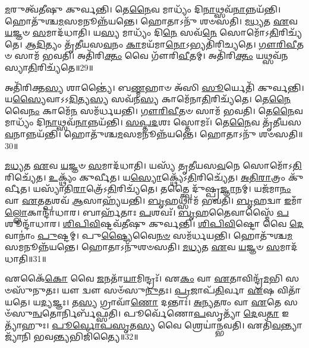 \-\ul{𑌮}\-𑌰𑍁𑌤𑍍𑌵᳴𑌤𑍀𑌷𑍁 𑌕𑍁𑌰𑍍𑌵𑌨𑍍𑌤𑌿।
𑌤𑍇\-\ul{𑌨𑍈}\-𑌵 𑌮𑌾𑌧𑍍𑌯𑌂᳴ 𑌦𑌿\-\ul{𑌨𑌾}\-𑌥𑍍𑌸𑌵᳴\-\ul{𑌨𑌾}\-𑌨𑍍𑌨𑌯᳴𑌨𑍍𑌤𑌿।
𑌹𑍋𑌤𑍁᳴𑌶𑍍𑌚\-\ul{𑌮}\-𑌸𑌮𑌨𑍂𑌨𑍍𑌨᳴𑌯𑌨𑍍𑌤𑍇।
𑌹𑍋𑌤𑌾𑌽𑌨𑍁᳴ 𑌶𑍞𑌸𑌤𑌿।
\-\ul{𑌮}\-\-\ul{𑌧𑍍𑌯}\-𑌤 \ul{𑌏}\-𑌵 \ul{𑌯}\-𑌜𑍍𑌞𑍞 \ul{𑌸}\-𑌮𑌾𑌦᳴𑌧𑌾𑌤𑌿।
𑌯\-\ul{𑌸𑍍𑌯} 𑌮𑌾𑌧𑍍𑌯𑌂᳴ 𑌦𑌿\-\ul{𑌨𑍇} 𑌸𑌵᳴\-\ul{𑌨𑍇} 𑌸𑍋𑌮𑍋᳴\-𑌽\-\ul{𑌤𑌿}\-𑌰𑌿𑌚𑍍𑌯᳴𑌤𑍇।
\-\ul{𑌆}\-\-\ul{𑌦𑌿}\-𑌤𑍍𑌯𑌂 𑌤𑍃᳴𑌤𑍀𑌯𑌸\-\ul{𑌵}\-𑌨𑌂 \ul{𑌕𑌾}\-𑌮𑌯᳴𑌮𑌾\-\ul{𑌨𑍋}\-\-𑌽𑌭𑍍𑌯𑌤𑌿᳴𑌰𑌿𑌚𑍍𑌯𑌤𑍇।
\-\ul{𑌗𑍗}\-\-\ul{𑌰𑌿}\-\-\ul{𑌵𑍀}\-𑌤𑍞 𑌸𑌾𑌮᳴ 𑌭𑌵𑌤𑌿।
𑌅𑌤𑌿᳴𑌰𑌿\-\ul{𑌕𑍍𑌤𑌂} 𑌵𑍈 𑌗𑍗᳴𑌰𑌿\-\ul{𑌵𑍀}\-𑌤𑌮𑍍।
𑌅𑌤𑌿᳴𑌰𑌿\-\ul{𑌕𑍍𑌤𑌂} 𑌯𑌥𑍍𑌸𑌵᳴𑌨𑌸𑍍𑌯𑌾\-\ul{𑌤𑌿}\-𑌰𑌿𑌚𑍍𑌯᳴𑌤𑍇॥29॥

𑌅𑌤𑌿᳴𑌰𑌿𑌕𑍍𑌤\-\ul{𑌸𑍍𑌯} 𑌶𑌾𑌨𑍍𑌤𑍍𑌯𑍈॑।
𑌬\-\ul{𑌣𑍍𑌮}\-𑌹𑌾𑍞 𑌅᳴𑌸𑌿 \ul{𑌸𑍂}\-𑌰𑍍𑌯𑍇𑌤𑌿᳴ 𑌕𑍁𑌰𑍍𑌵𑌨𑍍𑌤𑌿।
𑌯\-\ul{𑌸𑍍𑌯𑍈}\-𑌵𑌾\-𑌽𑌽\-\ul{𑌦𑌿}\-𑌤𑍍𑌯\-\ul{𑌸𑍍𑌯} 𑌸𑌵᳴𑌨\-\ul{𑌸𑍍𑌯} 𑌕𑌾𑌮𑍇᳴𑌨𑌾\-\ul{𑌤𑌿}\-𑌰𑌿𑌚𑍍𑌯᳴𑌤𑍇।
𑌤𑍇\-\ul{𑌨𑍈}\-𑌵𑍈\-\ul{𑌨𑌂} 𑌕𑌾𑌮𑍇᳴\-\ul{𑌨} 𑌸𑌮᳴𑌰𑍍𑌧𑌯𑌨𑍍𑌤𑌿।
\-\ul{𑌗𑍗}\-\-\ul{𑌰𑌿}\-\-\ul{𑌵𑍀}\-𑌤𑍞 𑌸𑌾𑌮᳴ 𑌭𑌵𑌤𑌿।
𑌤𑍇\-\ul{𑌨𑍈}\-𑌵 𑌮𑌾𑌧𑍍𑌯𑌂᳴ 𑌦𑌿\-\ul{𑌨𑌾}\-𑌥𑍍𑌸𑌵᳴\-\ul{𑌨𑌾}\-𑌨𑍍𑌨𑌯᳴𑌨𑍍𑌤𑌿।
\-\ul{𑌸}\-\-\ul{𑌪𑍍𑌤}\-\-\ul{𑌦}\-𑌶𑌃 𑌸𑍍𑌤𑍋𑌮𑌃᳴।
𑌤𑍇\-\ul{𑌨𑍈}\-𑌵 𑌤𑍃᳴𑌤𑍀𑌯𑌸\-\ul{𑌵}\-𑌨𑌾𑌨𑍍𑌨𑌯᳴𑌨𑍍𑌤𑌿।
𑌹𑍋𑌤𑍁᳴𑌶𑍍𑌚\-\ul{𑌮}\-𑌸𑌮𑌨𑍂𑌨𑍍𑌨᳴𑌯𑌨𑍍𑌤𑍇।
𑌹𑍋𑌤𑌾𑌽𑌨𑍁᳴ 𑌶𑍞𑌸𑌤𑌿॥30॥

\-\ul{𑌮}\-\-\ul{𑌧𑍍𑌯}\-𑌤 \ul{𑌏}\-𑌵 \ul{𑌯}\-𑌜𑍍𑌞𑍞 \ul{𑌸}\-𑌮𑌾𑌦᳴𑌧𑌾𑌤𑌿।
𑌯𑌸𑍍𑌯᳴ 𑌤𑍃𑌤𑍀𑌯𑌸\-\ul{𑌵}\-𑌨𑍇 𑌸𑍋𑌮𑍋᳴\-𑌽\-\ul{𑌤𑌿}\-𑌰𑌿𑌚𑍍𑌯𑍇᳴𑌤।
\-\ul{𑌉}\-𑌕𑍍𑌥𑍍𑌯𑌂᳴ 𑌕𑍁𑌰𑍍𑌵𑍀𑌤।
𑌯\-\ul{𑌸𑍍𑌯𑍋}\-𑌕𑍍𑌥𑍍𑌯𑍇᳴\-𑌽\-\ul{𑌤𑌿}\-𑌰𑌿𑌚𑍍𑌯𑍇᳴𑌤।
\-\ul{𑌅}\-\-\ul{𑌤𑌿}\-\-\ul{𑌰𑌾}\-𑌤𑍍𑌰𑌂 𑌕𑍁᳴𑌰𑍍𑌵𑍀𑌤।
𑌯𑌸𑍍𑌯𑌾᳴𑌤𑌿\-\ul{𑌰𑌾}\-𑌤𑍍𑌰𑍇᳴\-𑌽\-\ul{𑌤𑌿}\-𑌰𑌿𑌚𑍍𑌯᳴𑌤𑍇।
𑌤𑌤𑍍𑌤𑍍𑌵𑍈 𑌦𑍁᳴𑌷𑍍𑌪𑍍𑌰\-\ul{𑌜𑍍𑌞𑌾}\-𑌨𑌮𑍍।
𑌯𑌜᳴𑌮𑌾\-\ul{𑌨𑌂} 𑌵𑌾 \ul{𑌏}\-𑌤\-\ul{𑌤𑍍𑌪}\-𑌶𑌵᳴ \ul{𑌆}\-𑌸𑌾𑌹𑍍𑌯᳴𑌯𑌨𑍍𑌤𑌿।
\-\ul{𑌬𑍃}\-𑌹𑌥𑍍𑌸𑌾𑌮᳴ 𑌭𑌵𑌤𑌿।
\-\ul{𑌬𑍃}\-𑌹𑌦𑍍𑌵𑌾 \ul{𑌇}\-𑌮𑌾𑌁\-\ul{𑌲𑍍𑌲𑍋}\-𑌕𑌾𑌨𑍍𑌦𑌾᳴𑌧𑌾𑌰।
𑌬𑌾𑌰𑍍\mbox{}𑌹᳴𑌤𑌾𑌃 \ul{𑌪}\-𑌶𑌵𑌃᳴।
\-\ul{𑌬𑍃}\-\-\ul{𑌹}\-𑌤𑍈𑌵𑌾𑌸𑍍𑌮𑍈᳴ \ul{𑌪}\-𑌶𑍂𑌨𑍍𑌦𑌾᳴𑌧𑌾𑌰।
\-\ul{𑌶𑌿}\-\-\ul{𑌪𑌿}\-\-\ul{𑌵𑌿}\-𑌷𑍍𑌟𑌵᳴𑌤𑍀𑌷𑍁 𑌕𑍁𑌰𑍍𑌵𑌨𑍍𑌤𑌿।
\-\ul{𑌶𑌿}\-\-\ul{𑌪𑌿}\-\-\ul{𑌵𑌿}\-𑌷𑍍𑌟𑍋 𑌵𑍈 \ul{𑌦𑍇}\-𑌵𑌾𑌨𑌾𑌂॑ \ul{𑌪𑍁}\-𑌷𑍍𑌟𑌮𑍍।
𑌪𑍁\-\ul{𑌷𑍍𑌟𑍍𑌯𑍈}\-𑌵𑍈\-\ul{𑌨}\-\-\ul{𑍞} 𑌸𑌮᳴𑌰𑍍𑌧𑌯𑌨𑍍𑌤𑌿।
𑌹𑍋𑌤𑍁᳴𑌶𑍍𑌚\-\ul{𑌮}\-𑌸𑌮𑌨𑍂𑌨𑍍𑌨᳴𑌯𑌨𑍍𑌤𑍇।
𑌹𑍋𑌤𑌾𑌽𑌨𑍁᳴𑌶𑍞𑌸𑌤𑌿।
\-\ul{𑌮}\-\-\ul{𑌧𑍍𑌯}\-𑌤 \ul{𑌏}\-𑌵 \ul{𑌯}\-𑌜𑍍𑌞𑍞 \ul{𑌸}\-𑌮𑌾𑌦᳴𑌧𑌾𑌤𑌿॥31॥\anuvakamend[\-\ul{𑌯}\-\-\ul{𑌨𑍍𑌤𑌿} 𑌸𑌵᳴𑌨𑌸𑍍𑌯𑌾\-\ul{𑌤𑌿}\-𑌰𑌿𑌚𑍍𑌯᳴𑌤𑍇 𑌶𑍞𑌸𑌤𑌿 𑌦𑌾𑌧𑌾\-\ul{𑌰𑌾}\-𑌷𑍍𑌟𑍗 𑌚᳴]

𑌏𑌕𑍈᳴\-\ul{𑌕𑍋} 𑌵𑍈 \ul{𑌜}\-𑌨𑌤𑌾᳴\-\ul{𑌯𑌾}\-𑌮𑌿𑌨𑍍𑌦𑍍𑌰𑌃᳴।
𑌏\-\ul{𑌕𑌂} 𑌵𑌾 \ul{𑌏}\-𑌤𑌾𑌵𑌿𑌨𑍍𑌦𑍍𑌰᳴\-\ul{𑌮}\-𑌭𑌿 𑌸𑍞𑌸𑍁᳴𑌨𑍁𑌤𑌃।
𑌯𑍗 𑌦𑍍𑌵𑍗 𑌸𑍞᳴𑌸𑍁\-\ul{𑌨𑍁}\-𑌤𑌃।
\-\ul{𑌪𑍍𑌰}\-𑌜𑌾𑌪᳴\-\ul{𑌤𑌿}\-𑌰𑍍𑌵𑌾 \ul{𑌏}\-𑌷 𑌵𑌿𑌤𑌾᳴𑌯𑌤𑍇।
𑌯\-\ul{𑌦𑍍𑌯}\-𑌜𑍍𑌞𑌃।
𑌤\-\ul{𑌸𑍍𑌯} 𑌗𑍍𑌰𑌾𑌵𑌾᳴\-\ul{𑌣𑍋} 𑌦𑌨𑍍𑌤𑌾𑌃॑।
\-\ul{𑌅}\-\-\ul{𑌨𑍍𑌯}\-\-\ul{𑌤}\-𑌰𑌂 𑌵𑌾 \ul{𑌏}\-𑌤𑍇 𑌸𑍞᳴𑌸𑍁\-\ul{𑌨𑍍𑌵}\-𑌤𑍋𑌰𑍍𑌨𑌿𑌰𑍍𑌬᳴𑌫𑍍𑌸𑌤𑌿।
𑌪𑍂𑌰𑍍𑌵𑍇᳴𑌣𑍋\-\ul{𑌪}\-𑌸𑍃𑌤𑍍𑌯𑌾᳴ \ul{𑌦𑍇}\-𑌵\-\ul{𑌤𑌾} 𑌇𑌤𑍍𑌯𑌾᳴𑌹𑍁𑌃।
\-\ul{𑌪𑍂}\-\-\ul{𑌰𑍍𑌵𑍋}\-\-\ul{𑌪}\-\-\ul{𑌸𑍃}\-𑌤\-\ul{𑌸𑍍𑌯} 𑌵𑍈 𑌶𑍍𑌰𑍇𑌯𑌾॑𑌨𑍍𑌭𑌵𑌤𑌿।
𑌏𑌤𑌿᳴\-\ul{𑌵}\-𑌨𑍍𑌤𑍍𑌯𑌾𑌜𑍍𑌯𑌾᳴𑌨𑌿 𑌭𑌵\-\ul{𑌨𑍍𑌤𑍍𑌯}\-𑌭𑌿𑌜𑌿᳴𑌤𑍍𑌯𑍈॥32॥


